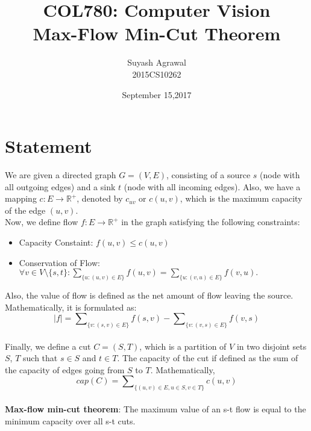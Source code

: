 \documentclass{article}
\title{COL780: Computer Vision\\Max-Flow Min-Cut Theorem}
\author{Suyash Agrawal\\2015CS10262}
\date{September 15,2017}
\begin{document}
\maketitle
\section{Statement}
    We are given a directed graph $G = (V,E)$, consisting of a source $s$ (node with all
    outgoing edges) and a sink $t$ (node with all incoming edges). Also, we have a mapping
    $c: E \rightarrow \mathbb{R}^{+}$, denoted by $c_{uv}$ or $c(u,v)$, which is the maximum capacity
    of the edge $(u,v)$.\\
    Now, we define flow $f: E \rightarrow \mathbb{R}^+$ in the graph satisfying the following constraints:
    \begin{itemize}
        \item Capacity Constaint: $f(u,v) \leq c(u,v)$
        \item Conservation of Flow: $\forall v\in V\setminus \{s,t\}: \sum \nolimits_{\{u:(u,v)\in E\}}f(u,v)
            =\sum \nolimits_{\{u:(v,u)\in E\}}f(v,u).$
    \end{itemize} 
    Also, the value of flow is defined as the net amount of flow leaving the source. Mathematically, it is formulated as:
    $$|f| = \sum \nolimits_{\{v:(s,v)\in E\}}f(s,v) - \sum \nolimits_{\{v:(v,s)\in E\}}f(v,s)$$
    \\
    Finally, we define a cut $C=(S,T)$, which is a partition of $V$ in two disjoint sets $S$, $T$ such that $s \in S$ and
    $t \in T$. The capacity of the cut if defined as the sum of the capacity of edges going from $S$ to $T$. Mathematically,
    $$cap(C) = \sum \nolimits_{\{(u,v)\in E, u \in S, v \in T\}}c(u,v)$$
    \\
    \textbf{Max-flow min-cut theorem}: The maximum value of an s-t flow is equal to the minimum capacity over all s-t cuts.
\end{document}
